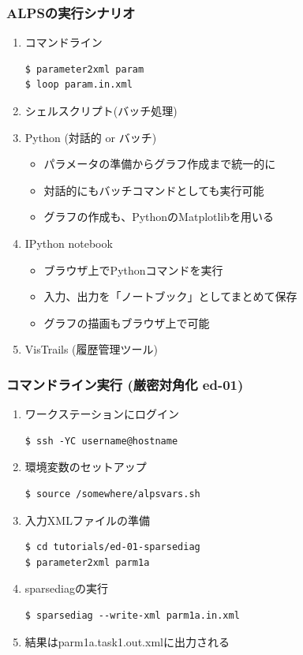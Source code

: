 \begin{frame}[t,fragile]
  \frametitle{ALPSの実行シナリオ}
  \begin{enumerate}
  \item コマンドライン
\begin{lstlisting}
$ parameter2xml param
$ loop param.in.xml
\end{lstlisting}
  \item シェルスクリプト(バッチ処理)
  \item Python (対話的 or バッチ)
    \begin{itemize}
    \item パラメータの準備からグラフ作成まで統一的に
    \item 対話的にもバッチコマンドとしても実行可能
    \item グラフの作成も、PythonのMatplotlibを用いる
    \end{itemize}
  \item IPython notebook
    \begin{itemize}
    \item ブラウザ上でPythonコマンドを実行
    \item 入力、出力を「ノートブック」としてまとめて保存
    \item グラフの描画もブラウザ上で可能
    \end{itemize}
  \item VisTrails (履歴管理ツール)
  \end{enumerate}
\end{frame}

\begin{frame}[t,fragile]
  \frametitle{コマンドライン実行 (厳密対角化 ed-01)}
  \begin{enumerate}
  \item ワークステーションにログイン
\begin{lstlisting}
$ ssh -YC username@hostname
\end{lstlisting}
  \item 環境変数のセットアップ
\begin{lstlisting}
$ source /somewhere/alpsvars.sh
\end{lstlisting}
  \item 入力XMLファイルの準備
\begin{lstlisting}
$ cd tutorials/ed-01-sparsediag
$ parameter2xml parm1a
\end{lstlisting}
  \item sparsediagの実行
\begin{lstlisting}
$ sparsediag --write-xml parm1a.in.xml
\end{lstlisting}
  \item 結果はparm1a.task1.out.xmlに出力される
  \end{enumerate}
\end{frame}

